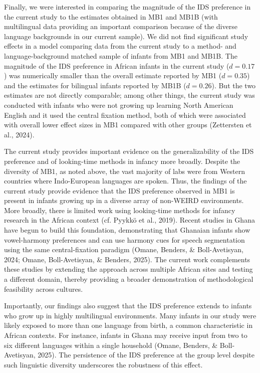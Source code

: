 \documentclass[
  english,
  ,man,floatsintext]{apa6}
\begin{document}
Finally, we were interested in comparing the magnitude of the IDS preference in the current study to the estimates obtained in MB1 and MB1B (with multilingual data providing an important comparison because of the diverse language backgrounds in our current sample). We did not find significant study effects in a model comparing data from the current study to a method- and language-background matched sample of infants from MB1 and MB1B. The magnitude of the IDS preference in African infants in the current study (\(d = 0.17\)) was numerically smaller than the overall estimate reported by MB1 (\(d = 0.35\)) and the estimates for bilingual infants reported by MB1B (\(d = 0.26\)). But the two estimates are not directly comparable; among other things, the current study was conducted with infants who were not growing up learning North American English and it used the central fixation method, both of which were associated with overall lower effect sizes in MB1 compared with other groups (Zettersten et al., 2024).

The current study provides important evidence on the generalizability of the IDS preference and of looking-time methods in infancy more broadly. Despite the diversity of MB1, as noted above, the vast majority of labs were from Western countries where Indo-European languages are spoken. Thus, the findings of the current study provide evidence that the IDS preference observed in MB1 is present in infants growing up in a diverse array of non-WEIRD environments. More broadly, there is limited work using looking-time methods for infancy research in the African context (cf. Pyykkö et al., 2019). Recent studies in Ghana have begun to build this foundation, demonstrating that Ghanaian infants show vowel-harmony preferences and can use harmony cues for speech segmentation using the same central-fixation paradigm (Omane, Benders, \& Boll-Avetisyan, 2024; Omane, Boll-Avetisyan, \& Benders, 2025). The current work complements these studies by extending the approach across multiple African sites and testing a different domain, thereby providing a broader demonstration of methodological feasibility across cultures.

Importantly, our findings also suggest that the IDS preference extends to infants who grow up in highly multilingual environments. Many infants in our study were likely exposed to more than one language from birth, a common characteristic in African contexts. For instance, infants in Ghana may receive input from two to six different languages within a single household (Omane, Benders, \& Boll-Avetisyan, 2025). The persistence of the IDS preference at the group level despite such linguistic diversity underscores the robustness of this effect.
\end{document}
